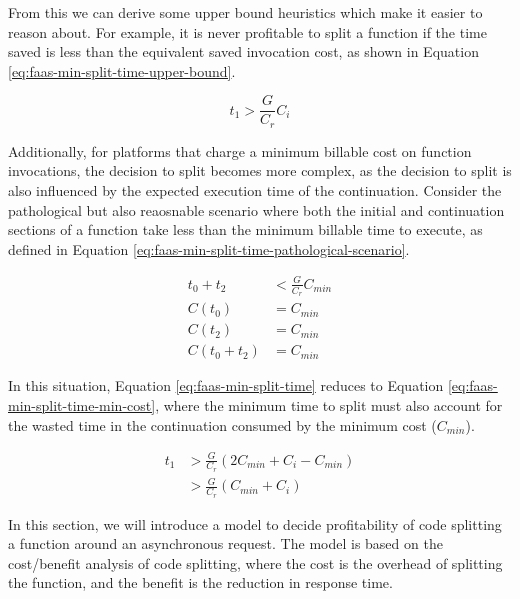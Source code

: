 From this we can derive some upper bound heuristics which make it easier to reason about. For example, it is never profitable to split a function if the time saved is less than the equivalent saved invocation cost, as shown in Equation \ref{eq:faas-min-split-time-upper-bound}.

\begin{equation} \label{eq:faas-min-split-time-upper-bound}
t_1 > \frac{G}{C_r} C_i
\end{equation}

Additionally, for platforms that charge a minimum billable cost on function invocations, the decision to split becomes more complex, as the decision to split is also influenced by the expected execution time of the continuation. Consider the pathological but also reaosnable scenario where both the initial and continuation sections of a function take less than the minimum billable time to execute, as defined in Equation \ref{eq:faas-min-split-time-pathological-scenario}.

\begin{equation} \label{eq:faas-min-split-time-pathological-scenario}
\begin{aligned}
t_0 + t_2 & < \frac{G}{C_r} C_{min} \\
C(t_0) & = C_{min} \\
C(t_2) & = C_{min} \\
C(t_0 + t_2) & = C_{min}
\end{aligned}
\end{equation}

In this situation, Equation \ref{eq:faas-min-split-time} reduces to Equation \ref{eq:faas-min-split-time-min-cost}, where the minimum time to split must also account for the wasted time in the continuation consumed by the minimum cost ($C_{min}$).

\begin{equation} \label{eq:faas-min-split-time-min-cost}
\begin{aligned}
t_1 & > \frac{G}{C_r} \left( 2 C_{min} + C_i - C_{min} \right) \\
    & > \frac{G}{C_r} \left( C_{min} + C_i \right)
\end{aligned}
\end{equation}

In this section, we will introduce a model to decide profitability of code splitting a function around an asynchronous request. The model is based on the cost/benefit analysis of code splitting, where the cost is the overhead of splitting the function, and the benefit is the reduction in response time.

